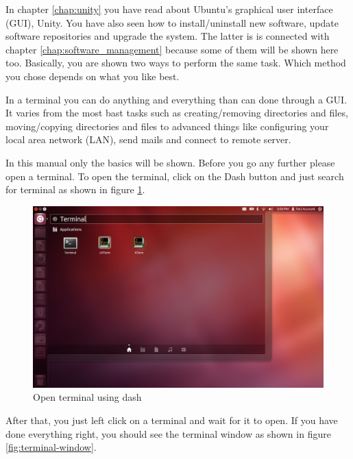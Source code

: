 In chapter \ref{chap:unity}  you have read about Ubuntu's graphical user interface (GUI), Unity. You have also seen how to install/uninstall new software, update software repositories and upgrade the system. The latter is is connected with chapter \ref{chap:software_management} because some of them will be shown here too. Basically, you are shown two ways to perform the same task. Which method you chose depends on what you like best. \\

\par \noindent In a terminal you can do anything and everything than can done through a GUI. It varies from the most bast tasks such as  creating/removing directories and files, moving/copying  directories and files to advanced things like configuring your local area network (LAN), send mails and connect to remote server. \\

\par \noindent In this manual only the basics will be shown. Before you go any further please open a terminal. To open the terminal, click  on the Dash button and just search for terminal as shown in figure \ref{fig:open-terminal}. 

\begin{figure}[h]	
	\centering
	\includegraphics[width=400pt]{./images/terminal/open-terminal.png}
	\caption{Open terminal using dash}	
	\label{fig:open-terminal}	
\end{figure}

\par \noindent After that, you just left click on a terminal and wait for it to open. If you have done everything right, you should see the terminal window as shown in figure \ref{fig:terminal-window}.  \\

